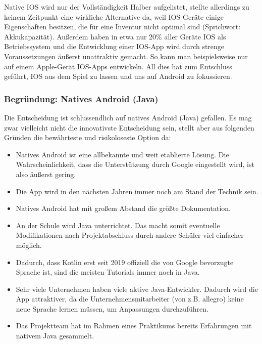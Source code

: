 Native IOS wird nur der Vollständigkeit Halber aufgelistet, stellte
allerdings zu keinem Zeitpunkt eine wirkliche Alternative da, weil
IOS-Geräte einige Eigenschaften besitzen, die für eine Inventur nicht
optimal sind (Sprichwort: Akkukapazität). Außerdem haben in etwa nur
20\% aller Geräte \cite{ios-market-share} IOS als Betriebssystem und die
Entwicklung einer IOS-App wird durch strenge Voraussetzungen äußerst
unattraktiv gemacht. So kann man beispielsweise nur auf einem
Apple-Gerät IOS-Apps entwickeln. All dies hat zum Entschluss geführt,
IOS aus dem Spiel zu lassen und uns auf Android zu fokussieren.

\hypertarget{begruxfcndung-natives-android-java}{%
\subsubsection{Begründung: Natives Android
(Java)}\label{begruxfcndung-natives-android-java}}

Die Entscheidung ist schlussendlich auf natives Android (Java) gefallen.
Es mag zwar vielleicht nicht die innovativste Entscheidung sein, stellt
aber aus folgenden Gründen die bewährteste und risikoloseste Option da:

\begin{itemize}
\tightlist
\item
  Natives Android ist eine allbekannte und weit etablierte Lösung. Die
  Wahrscheinlichkeit, dass die Unterstützung durch Google eingestellt
  wird, ist also äußerst gering.
\item
  Die App wird in den nächsten Jahren immer noch am Stand der Technik
  sein.
\item
  Natives Android hat mit großem Abstand die größte Dokumentation.
\item
  An der Schule wird Java unterrichtet. Das macht somit eventuelle
  Modifikationen nach Projektabschluss durch andere Schüler viel
  einfacher möglich.
\item
  Dadurch, dass Kotlin erst seit 2019 \cite{kotlin-preference} offiziell
  die von Google bevorzugte Sprache ist, sind die meisten Tutorials
  immer noch in Java.
\item
  Sehr viele Unternehmen haben viele aktive Java-Entwickler. Dadurch
  wird die App attraktiver, da die Unternehmensmitarbeiter (von z.B.
  allegro) keine neue Sprache lernen müssen, um Anpassungen
  durchzuführen.
\item
  Das Projektteam hat im Rahmen eines Praktikums bereits Erfahrungen mit
  nativem Java gesammelt.
\end{itemize}

